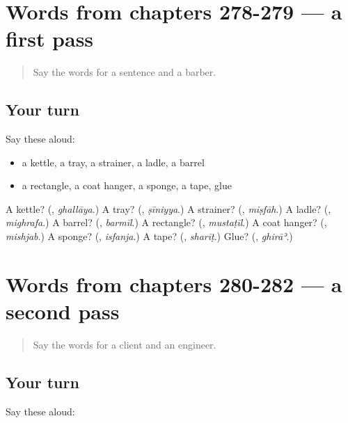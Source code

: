 \section[(dialogue)]{Words from chapters 278-279 — a first pass}

\label{lesson:AR-R282-first-pass-words-from-chapters-278-279}



\begin{quote}
Say the words for a sentence and a barber.
\end{quote}

\subsection*{Your turn}
Say these aloud:

\begin{itemize}
\raggedright
  \item a kettle, a tray, a strainer, a ladle, a barrel
  \item a rectangle, a coat hanger, a sponge, a tape, glue
\end{itemize}

\begin{tcolorbox}[breakable,colback=teal!4,colframe=teal!35!black,title={Before you move on}]
A kettle? (\textbf{}, \emph{ghallāya}.) A tray? (\textbf{}, \emph{ṣīniyya}.) A strainer? (\textbf{}, \emph{miṣfāh}.) A ladle? (\textbf{}, \emph{mighrafa}.) A barrel? (\textbf{}, \emph{barmīl}.) A rectangle? (\textbf{}, \emph{mustaṭīl}.) A coat hanger? (\textbf{}, \emph{mishjab}.) A sponge? (\textbf{}, \emph{isfanja}.) A tape? (\textbf{}, \emph{sharīṭ}.) Glue? (\textbf{}, \emph{ghirāʾ}.)
\end{tcolorbox}
\section[(dialogue)]{Words from chapters 280-282 — a second pass}

\label{lesson:AR-R282-second-pass-words-from-chapters-280-282}



\begin{quote}
Say the words for a client and an engineer.
\end{quote}

\subsection*{Your turn}
Say these aloud:

